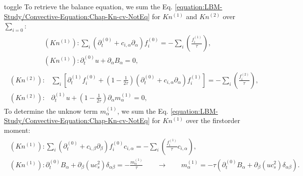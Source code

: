 \documentclass[letterpaper,10pt,english,openany,oneside]{jupyterBook}
\begin{document}
\begin{sphinxuseclass}{toggle}
\sphinxAtStartPar
To retrieve the balance equation, we sum the Eq. \eqref{equation:LBM-Study/Convective-Equation:Chap-Kn-cv-NotEq} for \(Kn^{(1)}\) and \(Kn^{(2)}\) over \(\sum_{i=0} \):
\begin{equation}\label{equation:LBM-Study/Convective-Equation:cv-Kn1-B0-all}
\begin{split}
\begin{array}{l}
(Kn^{(1)}): \displaystyle\sum_{i}\left( \partial_{t}^{(0)} + c_{i,\alpha}\partial_{\alpha} \right)f_{i}^{(0)}= - \displaystyle\sum_{i}\left(\displaystyle\frac{ f_{i}^{(1)} }{ \tau } \right),\\
(Kn^{(1)}): \partial_{t}^{(0)}  u + \partial_{\alpha} B_{\alpha} =0,
\end{array}
\end{split}
\end{equation}\begin{equation}\label{equation:LBM-Study/Convective-Equation:cv-Kn2-B0-all}
\begin{split}
\begin{array}{ll}
(Kn^{(2)}):& \displaystyle\sum_{i}\left[ \partial_{t}^{(1)} f_{i}^{(0)} + \displaystyle\left(1 - \frac{1}{2\tau}\right)\left( \partial_{t}^{(0)} + c_{i,\alpha}\partial_{\alpha} \right) f_{i}^{(1)}   \right]=  - \displaystyle\sum_{i}\left(\displaystyle\frac{ f_{i}^{(2)} }{ \tau } \right), \\
(Kn^{(2)}):& \partial_{t}^{(1)} u + \displaystyle\left(1 - \frac{1}{2\tau}\right)\partial_{\alpha} m^{(1)}_{\alpha} = 0,
\end{array}
\end{split}
\end{equation}
\sphinxAtStartPar
To determine the unknow term \(m^{(1)}_{\alpha}\), we sum the Eq. \eqref{equation:LBM-Study/Convective-Equation:Chap-Kn-cv-NotEq} for \(Kn^{(1)}\) over the first\sphinxhyphen{}order moment:
\begin{equation}\label{equation:LBM-Study/Convective-Equation:cv-Kn1-B1-all}
\begin{split}
\begin{array}{l}
(Kn^{(1)}): \displaystyle\sum_{i}\left( \partial_{t}^{(0)} + c_{i,\beta}\partial_{\beta} \right)f_{i}^{(0)}c_{i,\alpha}= - \displaystyle\sum_{i}\left(\displaystyle\frac{ f_{i}^{(1)} }{ \tau } c_{i,\alpha} \right),\\
(Kn^{(1)}): \partial_{t}^{(0)}  B_{\alpha} + \partial_{\beta} \left(uc_{s}^{2}\right)\delta_{\alpha\beta} = - \displaystyle\frac{m^{(1)}_{\alpha}}{\tau} \quad \quad \rightarrow \quad \quad   m^{(1)}_{\alpha} =-\tau\left( \partial_{t}^{(0)}  B_{\alpha} + \partial_{\beta} \left(uc_{s}^{2}\right)\delta_{\alpha\beta} \right).

\end{array}
\end{split}
\end{equation}
\end{sphinxuseclass}
\end{document}
